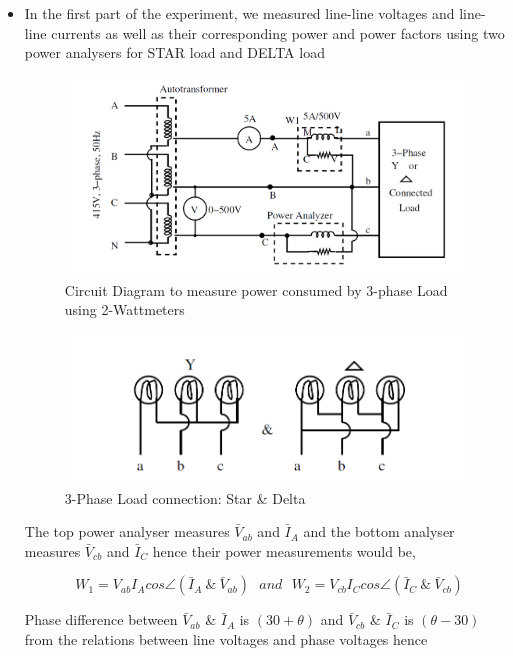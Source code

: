\documentclass[12pt]{article}
\begin{document}
  \begin{itemize}
      \item In the first part of the experiment, we measured line-line voltages and line-line currents as well as their corresponding power and power factors using two power analysers for STAR load and DELTA load
      
      \begin{figure}[H]
          \centering
          \includegraphics[width = 0.9\linewidth]{LAB-1/1.PNG}
          \caption{Circuit Diagram to measure power consumed by 3-phase Load 
           using 2-Wattmeters}
      \end{figure}
      
      \begin{figure}[H]
          \centering
          \includegraphics[width = 0.7\linewidth]{LAB-1/1-1.PNG}
          \caption{3-Phase Load connection: Star & Delta}
      \end{figure}
      
      The top power analyser measures $\bar{V}_{ab}$ and $\bar{I}_{A}$ and the bottom analyser measures $\bar{V}_{cb}$ and $\bar{I}_{C}$ hence their power measurements would be,
      
      \begin{equation}
         \ \ \ W_1 = V_{ab}I_{A}cos\angle(\bar{I}_{A} \ \& \ \bar{V}_{ab}) \ \ \ and \ \ \ W_2 = V_{cb}I_{C}cos\angle( \bar{I}_{C} \ \& \ \bar{V}_{cb}) 
      \end{equation}
      
      Phase difference between $\bar{V}_{ab}$ \& $\bar{I}_{A}$ is $(30 + \theta)$ and $\bar{V}_{cb}$ \& $\bar{I}_{C}$ is $(\theta - 30)$ from the relations between line voltages and phase voltages hence
      

\end{itemize}
\end{document}
